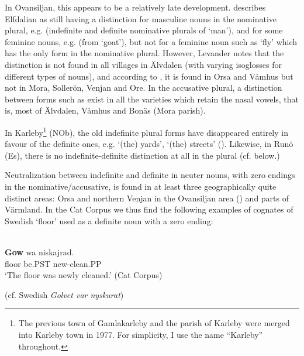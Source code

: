 In Ovansiljan, this appears to be a relatively late development. \citet{Levander1909} describes Elfdalian as still having a distinction for masculine nouns in the nominative plural, e.g. (indefinite and definite nominative plurals of ‘man’), and for some feminine nouns, e.g.  (from  ‘goat’), but not for a feminine noun such as ‘fly’ which has the only form  in the nominative plural. However, Levander notes that the distinction is not found in all villages in Älvdalen (with varying isoglosses for different types of nouns), and according to \citet[170]{Levander1928}, it is found in Orsa and Våmhus but not in Mora, Sollerön, Venjan and Ore. In the accusative plural, a distinction between forms such as exist in all the varieties which retain the nasal vowels, that is, most of Älvdalen, Våmhus and Bonäs (Mora parish). 

In Karleby\footnote{ The previous town of Gamlakarleby and the parish of Karleby were merged into Karleby town in 1977. For simplicity, I use the name “Karleby” throughout. } (NOb), the old indefinite plural forms have disappeared entirely in favour of the definite ones, e.g.  ‘(the) yards’,  ‘(the) streets’ (\citet[93]{Hagfors1891}). Likewise, in Runö (Es), there is no indefinite-definite distinction at all in the plural (cf.  below.)

Neutralization between indefinite and definite in neuter nouns, with zero endings in the nominative/accusative, is found in at least three geographically quite distinct areas: Orsa and northern Venjan in the Ovansiljan area (\citet[133]{Levander1928}) and parts of Värmland. In the Cat Corpus we thus find the following examples of cognates of Swedish  ‘floor’ used as a definite noun with a zero ending:

\ea\label{}
\\
\gll	\textbf{Gow} wa  niskajrad.\\
		floor  be.PST  new-clean.PP\\
\glt 	‘The floor was newly cleaned.’ (Cat Corpus)

\z

(cf. Swedish \textit{Golvet var nyskurat}) 

